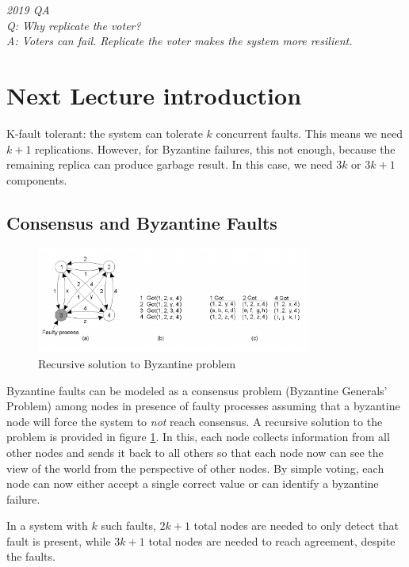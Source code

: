 \documentclass[twoside]{article}
\begin{document}
  \textit{2019 QA\\
  Q: Why replicate the voter?\\
  A: Voters can fail. Replicate the voter makes the system more resilient.\\
  }

\section{Next Lecture introduction}
K-fault tolerant: the system can tolerate $k$ concurrent faults. This means we need $k + 1$ replications. However, for Byzantine failures, this not enough, because the remaining replica can produce garbage result. In this case, we need $3k$ or $3k+1$ components.

\subsection{Consensus and Byzantine Faults}

\begin{figure}
\begin{center}
   \includegraphics[width=0.8\textwidth]{byzantine.png}
   \caption{Recursive solution to Byzantine problem}
   \label{fig:byzantine}
\end{center}
\end{figure}

Byzantine faults can be modeled as a consensus problem (Byzantine Generals'
Problem) among nodes in presence of faulty processes assuming that a byzantine
node will force the system to \textit{not} reach consensus. A recursive solution
to the problem is provided in figure \ref{fig:byzantine}. In this, each node
collects information from all other nodes and sends it back to all others so
that each node now can see the view of the world from the perspective of other
nodes. By simple voting, each node can now either accept a single correct value or
can identify a byzantine failure.

In a system with $k$ such faults, $2k + 1$ total nodes are needed to only detect
that fault is present, while $3k + 1$ total nodes are needed to reach agreement,
despite the faults.
\end{document}
